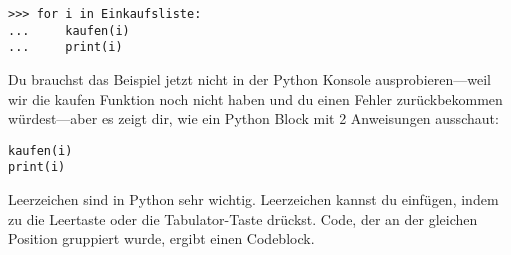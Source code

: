 \begin{listingignore}
\begin{verbatim}
>>> for i in Einkaufsliste:
...     kaufen(i)
...     print(i)
\end{verbatim}
\end{listingignore}

Du brauchst das Beispiel jetzt nicht in der Python Konsole ausprobieren---weil wir die kaufen Funktion noch nicht haben und du einen Fehler zurückbekommen würdest---aber es zeigt dir, wie ein Python Block mit 2 Anweisungen ausschaut:

\begin{listingignore}
\begin{verbatim}
kaufen(i)
print(i)
\end{verbatim}
\end{listingignore}

Leerzeichen sind in Python sehr wichtig. Leerzeichen kannst du einfügen, indem zu die Leertaste oder die Tabulator-Taste drückst. Code, der an der gleichen Position gruppiert wurde, ergibt einen Codeblock.


